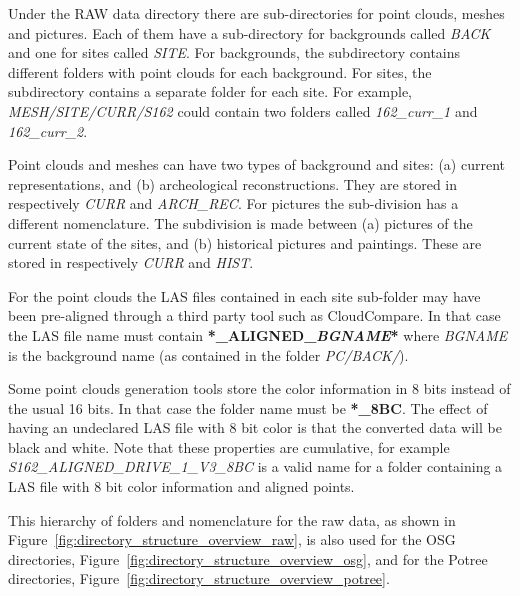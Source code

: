 Under the RAW data directory there are sub-directories for point clouds, meshes
and pictures. Each of them have a sub-directory for backgrounds called \textit{BACK}
and one for sites called \textit{SITE}. For backgrounds, the subdirectory contains
different folders with point clouds for each background. For sites, the subdirectory
contains a separate folder for each site. For example, \textit{MESH/SITE/CURR/S162}
could contain two folders called \textit{162\_curr\_1} and \textit{162\_curr\_2}.

Point clouds and meshes can have two types of background and sites: (a) current
representations, and (b) archeological reconstructions. They are stored in respectively
\textit{CURR} and \textit{ARCH\_REC}. For pictures the sub-division has a different
nomenclature. The subdivision is made between (a) pictures of the current state of
the sites, and (b) historical pictures and paintings. These are stored in respectively
\textit{CURR} and \textit{HIST}.

For the point clouds the LAS files contained in each site sub-folder may have been pre-aligned through a
third party tool such as CloudCompare. In that case the LAS file name must contain
\textbf{*\_ALIGNED\_\textit{BGNAME}*} where \textit{BGNAME} is the background name
(as contained in the folder \textit{PC/BACK/}).

Some point clouds generation tools store the color information in 8 bits instead of
the usual 16 bits. In that case the folder name must be \textbf{*\_8BC}. The effect
of having an undeclared LAS file with 8 bit color is that the converted data will be
black and white. Note that these properties are cumulative, for example
\textit{S162\_ALIGNED\_DRIVE\_1\_V3\_8BC} is a valid name for a folder containing
a LAS file with 8 bit color information and aligned points.

This hierarchy of folders and nomenclature for the raw data, as shown in Figure~\ref{fig:directory_structure_overview_raw},
is also used for the OSG directories, Figure~\ref{fig:directory_structure_overview_osg},
and for the Potree directories, Figure~\ref{fig:directory_structure_overview_potree}.

